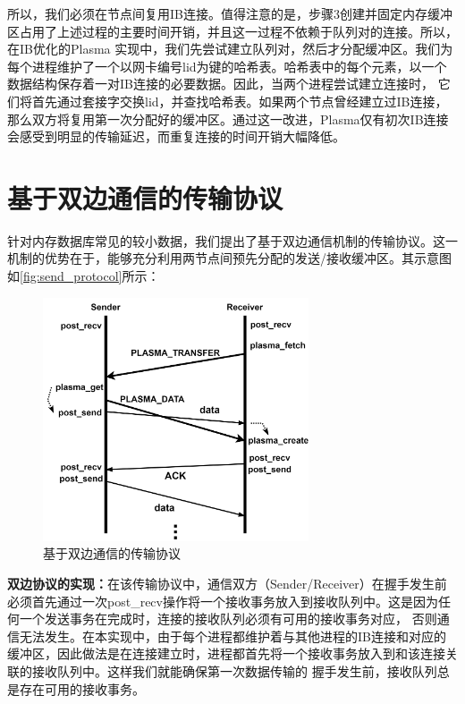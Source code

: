 所以，我们必须在节点间复用IB连接。值得注意的是，步骤3创建并固定内存缓冲区占用了上述过程的主要时间开销，并且这一过程不依赖于队列对的连接。所以，在IB优化的Plasma
实现中，我们先尝试建立队列对，然后才分配缓冲区。我们为每个进程维护了一个以网卡编号lid为键的哈希表。哈希表中的每个元素，以一个数据结构保存着一对IB连接的必要数据。因此，当两个进程尝试建立连接时，
它们将首先通过套接字交换lid，并查找哈希表。如果两个节点曾经建立过IB连接，那么双方将复用第一次分配好的缓冲区。通过这一改进，Plasma仅有初次IB连接会感受到明显的传输延迟，而重复连接的时间开销大幅降低。

\section{基于双边通信的传输协议}

针对内存数据库常见的较小数据，我们提出了基于双边通信机制的传输协议。这一机制的优势在于，能够充分利用两节点间预先分配的发送/接收缓冲区。其示意图如\autoref{fig:send_protocol}所示：

\begin{figure}[h]
	\centering
	\includegraphics[width=0.7\textwidth]{image/chap03/send_protocol.png}
	\caption{基于双边通信的传输协议}
	\label{fig:send_protocol}
\end{figure}

\textbf{双边协议的实现：}在该传输协议中，通信双方（Sender/Receiver）在握手发生前必须首先通过一次post\_recv操作将一个接收事务放入到接收队列中。这是因为任何一个发送事务在完成时，连接的接收队列必须有可用的接收事务对应，
否则通信无法发生。在本实现中，由于每个进程都维护着与其他进程的IB连接和对应的缓冲区，因此做法是在连接建立时，进程都首先将一个接收事务放入到和该连接关联的接收队列中。这样我们就能确保第一次数据传输的
握手发生前，接收队列总是存在可用的接收事务。

